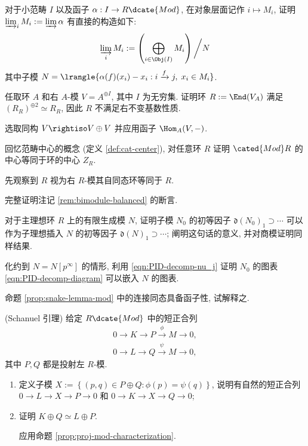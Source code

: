 \begin{Exercises}
	\item 对于小范畴 $I$ 以及函子 $\alpha: I \to R\dcate{Mod}$, 在对象层面记作 $i \mapsto M_i$, 证明 $\varinjlim_i M_i := \varinjlim \alpha$ 有直接的构造如下:
	\[ \varinjlim_i M_i := \left( \bigoplus_{i \in \Obj(I)} M_i \right) \bigg/N \]
	其中子模 $N = \lrangle{ \alpha(f)(x_i) - x_i : i \xrightarrow{f} j, \;  x_i \in M_i }$.
	\item 任取环 $A$ 和右 $A$-模 $V = A^{\oplus I}$, 其中 $I$ 为无穷集. 证明环 $R := \End(V_A)$ 满足 $(R_R)^{\oplus 2} \simeq R_R$, 因此 $R$ 不满足右不变基数性质. \begin{hint} 选取同构 $V \rightiso V \oplus V$ 并应用函子 $\Hom_A(V, -)$.\end{hint}
	\item 回忆范畴中心的概念 (定义 \ref{def:cat-center}), 对任意环 $R$ 证明 $\cated{Mod}R$ 的中心等同于环的中心 $Z_R$. \begin{hint} 先观察到 $R$ 视为右 $R$-模其自同态环等同于 $R$.\end{hint}
	\item 完整证明注记 \ref{rem:bimodule-balanced} 的断言.
	\item 对于主理想环 $R$ 上的有限生成模 $N$, 证明子模 $N_0$ 的初等因子 $\mathfrak{d}(N_0)_1 \supset \cdots$ 可以作为子理想插入 $N$ 的初等因子 $\mathfrak{d}(N)_1 \supset \cdots$; 阐明这句话的意义, 并对商模证明同样结果. \begin{hint} 化约到 $N=N[p^\infty]$ 的情形, 利用 \eqref{eqn:PID-decomp-nu_j} 证明 $N_0$ 的图表 \eqref{eqn:PID-decomp-diagram} 可以嵌入 $N$ 的图表.\end{hint}
	\item 命题 \ref{prop:snake-lemma-mod} 中的连接同态具备函子性, 试解释之.
	\item (Schanuel 引理) 给定 $R\dcate{Mod}$ 中的短正合列
		\begin{gather*}
			0 \to K \to P \xrightarrow{\phi} M \to 0, \\
			0 \to L \to Q \xrightarrow{\psi} M \to 0,
		\end{gather*}
		其中 $P, Q$ 都是投射左 $R$-模.
		\begin{enumerate}
			\item 定义子模 $X := \left\{(p,q) \in P \oplus Q: \phi(p) = \psi(q) \right\}$, 说明有自然的短正合列 $0 \to L \to X \to P \to 0$ 和 $0 \to K \to X \to Q \to 0$;
			\item 证明 $K \oplus Q \simeq L \oplus P$. \begin{hint} 应用命题 \ref{prop:proj-mod-characterization}. \end{hint}

\end{enumerate}
\end{Exercises}
